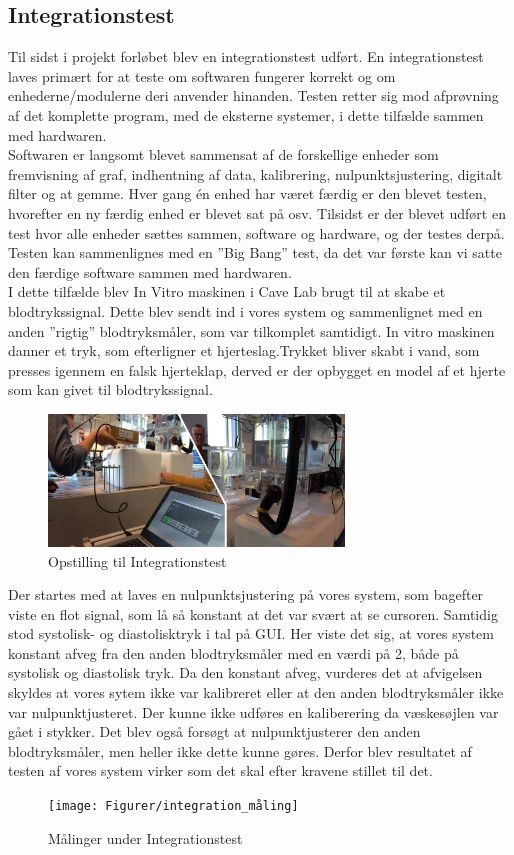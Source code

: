 \subsection{Integrationstest}
Til sidst i projekt forløbet blev en integrationstest\cite{Integration} udført. En integrationstest laves primært for at teste om softwaren fungerer korrekt og om enhederne/modulerne deri anvender hinanden. Testen retter sig mod afprøvning af det komplette program, med de eksterne systemer, i dette tilfælde sammen med hardwaren.\\
Softwaren er langsomt blevet sammensat af de forskellige enheder som fremvisning af graf, indhentning af data, kalibrering, nulpunktsjustering, digitalt filter og at gemme. Hver gang én enhed har været færdig er den blevet testen, hvorefter en ny færdig enhed er blevet sat på osv. Tilsidst er der blevet udført  en test hvor alle enheder sættes sammen, software og hardware,  og der testes derpå. Testen kan sammenlignes med en ”Big Bang” test, da det var første kan vi satte den færdige software sammen med hardwaren.\\  
I dette tilfælde blev In Vitro maskinen i Cave Lab brugt til at skabe et blodtrykssignal. Dette blev sendt ind i vores system og sammenlignet med en anden ”rigtig” blodtryksmåler, som var tilkomplet samtidigt.  In vitro maskinen danner et tryk, som efterligner et hjerteslag.Trykket bliver skabt i vand, som presses igennem en falsk hjerteklap, derved er der opbygget en model af et hjerte som kan givet til blodtrykssignal. 

\begin{figure}[H]
	\centering
	\includegraphics[width=0.7\textwidth]{Figurer/integration_opstilling}
	\caption{Opstilling til Integrationstest}
	\label{fig:Integration_opstilling}
\end{figure}

Der startes med at laves en nulpunktsjustering på vores system, som bagefter viste en flot signal, som lå så konstant at det var svært at se cursoren. Samtidig stod systolisk- og diastolisktryk i tal på GUI. Her viste det sig, at vores system konstant afveg fra den anden blodtryksmåler med en værdi på 2, både på systolisk og diastolisk tryk. Da den konstant afveg, vurderes det at afvigelsen skyldes at vores sytem ikke var kalibreret eller at den anden blodtryksmåler ikke var nulpunktjusteret.  Der kunne ikke udføres en kaliberering da væskesøjlen var gået i stykker. Det blev også forsøgt at nulpunktjusterer den anden blodtryksmåler, men heller ikke dette kunne gøres.  Derfor blev resultatet af testen af vores system virker som det skal efter kravene stillet til det.  

\begin{figure}[H]
	\centering
	\texttt{[image: Figurer/integration\_måling]}
	\caption{Målinger under Integrationstest}
	\label{fig:Integration_resultat}
\end{figure}

